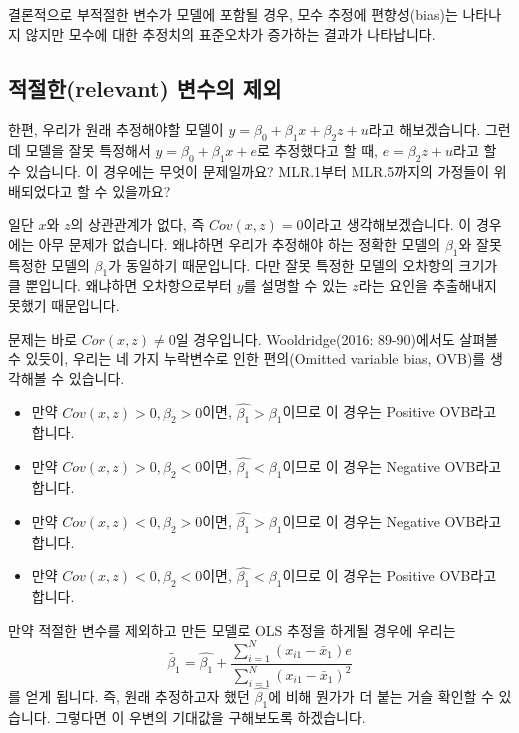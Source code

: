\documentclass[
]{book}
\begin{document}
결론적으로 부적절한 변수가 모델에 포함될 경우, 모수 추정에 편향성(bias)는 나타나지 않지만 모수에 대한 추정치의 표준오차가 증가하는 결과가 나타납니다.

\hypertarget{uxc801uxc808uxd55crelevant-uxbcc0uxc218uxc758-uxc81cuxc678}{%
\subsection{적절한(relevant) 변수의 제외}\label{uxc801uxc808uxd55crelevant-uxbcc0uxc218uxc758-uxc81cuxc678}}

한편, 우리가 원래 추정해야할 모델이 \(y = \beta_0 + \beta_1x + \beta_2z + u\)라고 해보겠습니다. 그런데 모델을 잘못 특정해서 \(y = \beta_0 + \beta_1x + e\)로 추정했다고 할 때, \(e = \beta_2z + u\)라고 할 수 있습니다. 이 경우에는 무엇이 문제일까요? MLR.1부터 MLR.5까지의 가정들이 위배되었다고 할 수 있을까요?

일단 \(x\)와 \(z\)의 상관관계가 없다, 즉 \(Cov(x, z) = 0\)이라고 생각해보겠습니다. 이 경우에는 아무 문제가 없습니다. 왜냐하면 우리가 추정해야 하는 정확한 모델의 \(\beta_1\)와 잘못 특정한 모델의 \(\beta_1\)가 동일하기 때문입니다. 다만 잘못 특정한 모델의 오차항의 크기가 클 뿐입니다. 왜냐하면 오차항으로부터 \(y\)를 설명할 수 있는 \(z\)라는 요인을 추출해내지 못했기 때문입니다.

문제는 바로 \(Cor(x, z)\neq0\)일 경우입니다. Wooldridge(2016: 89-90)에서도 살펴볼 수 있듯이, 우리는 네 가지 누락변수로 인한 편의(Omitted variable bias, OVB)를 생각해볼 수 있습니다.

\begin{itemize}
\item
  만약 \(Cov(x, z) > 0, \beta_2 > 0\)이면, \(\hat{\beta_1} > \beta_1\)이므로 이 경우는 Positive OVB라고 합니다.
\item
  만약 \(Cov(x, z) > 0, \beta_2 < 0\)이면, \(\hat{\beta_1} < \beta_1\)이므로 이 경우는 Negative OVB라고 합니다.
\item
  만약 \(Cov(x, z) < 0, \beta_2 > 0\)이면, \(\hat{\beta_1} > \beta_1\)이므로 이 경우는 Negative OVB라고 합니다.
\item
  만약 \(Cov(x, z) < 0, \beta_2 < 0\)이면, \(\hat{\beta_1} < \beta_1\)이므로 이 경우는 Positive OVB라고 합니다.
\end{itemize}

만약 적절한 변수를 제외하고 만든 모델로 OLS 추정을 하게될 경우에 우리는
\begin{equation*}
\tilde{\beta_1}=\hat{\beta_1} + \frac{\sum^N_{i=1}(x_{i1}-\bar{x}_1)e}{\sum^N_{i=1}(x_{i1}-\bar{x}_1)^2}
\end{equation*}
를 얻게 됩니다. 즉, 원래 추정하고자 했던 \(\hat{\beta_1}\)에 비해 뭔가가 더 붙는 거슬 확인할 수 있습니다. 그렇다면 이 우변의 기대값을 구해보도록 하겠습니다.
\end{document}

